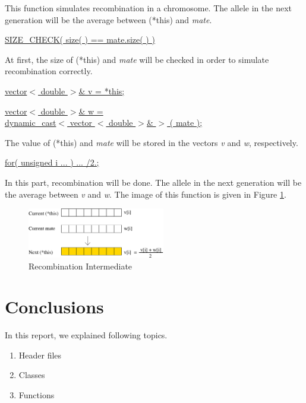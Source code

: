 \documentclass[twocolumn]{article}
\begin{document}
\noindent
This function simulates recombination in a chromosome. The allele in
the next generation will be the average between (*this) and {\em
mate}.

\vspace*{2mm}

\noindent
\underline{SIZE\_CHECK( size( ) == mate.size( ) )}

\noindent
At first, the size of (*this) and {\em mate} will be checked in order
to simulate recombination correctly.

\vspace*{2mm}

\noindent
\underline{vector$<$ double $>$\& v = *this;}

\noindent
\underline{vector$<$ double $>$\& w = }\\
\underline{dynamic\_cast$<$ vector $<$ double $>$\& $>$ ( mate );}

\noindent
The value of (*this) and {\em mate} will be stored in the vectors {\em
v} and {\em w}, respectively.

\vspace*{2mm}

\noindent
\underline{for( unsigned i ... ) ... /2.;}

\noindent
In this part, recombination will be done. The allele in the next
generation will be the average between {\em v} and {\em w}. The image
of this function is given in Figure \ref{Recombination}.

\begin{figure}[h]
\begin{center}
\includegraphics[width=6cm]{recombination.eps}
\caption{Recombination Intermediate}
\label{Recombination}
\end{center}
\end{figure}

\section{Conclusions}

\noindent
In this report, we explained following topics.

\begin{enumerate}
\item Header files
\item Classes
\item Functions
\end{enumerate}
\end{document}
